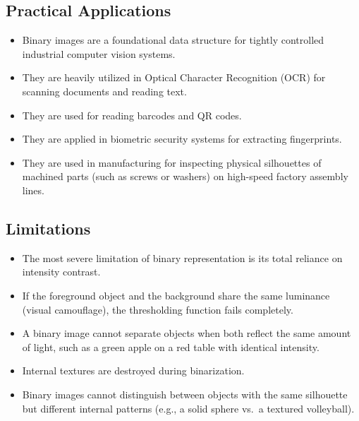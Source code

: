 \documentclass[12pt]{article}
\begin{document}
\subsection{Practical Applications}
\begin{itemize}
    \item Binary images are a foundational data structure for tightly controlled industrial computer vision systems.

    \item They are heavily utilized in Optical Character Recognition (OCR) for scanning documents and reading text.

    \item They are used for reading barcodes and QR codes.

    \item They are applied in biometric security systems for extracting fingerprints.

    \item They are used in manufacturing for inspecting physical silhouettes of machined parts (such as screws or washers) on high-speed factory assembly lines.
\end{itemize}


\subsection{Limitations}
\begin{itemize}
    \item The most severe limitation of binary representation is its total reliance on intensity contrast.

    \item If the foreground object and the background share the same luminance (visual camouflage), the thresholding function fails completely.

    \item A binary image cannot separate objects when both reflect the same amount of light, such as a green apple on a red table with identical intensity.

    \item Internal textures are destroyed during binarization.

    \item Binary images cannot distinguish between objects with the same silhouette but different internal patterns (e.g., a solid sphere vs.\ a textured volleyball).
\end{itemize}
\end{document}
